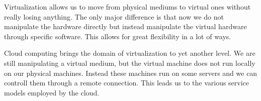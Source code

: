 Virtualization allows us to move from physical mediums to virtual ones
without really losing anything. The only major difference is that now
we do not manipulate the hardware directly but instead manipulate the
virtual hardware through specific software. This allows for great
flexibility in a lot of ways.

Cloud computing brings the domain of virtualization to yet another
level. We are still manipulating a virtual medium, but the virtual
machine does not run locally on our physical machines. Instead these
machines run on some servers and we can controll them through a remote
connection. This leads us to the various service models employed by
the cloud.

